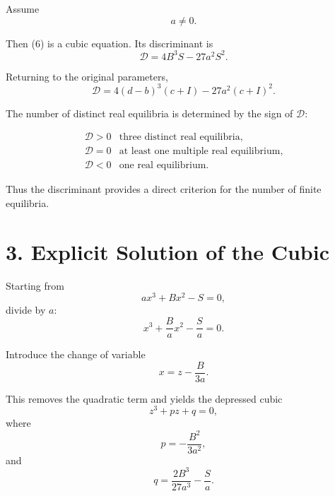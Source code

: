 \documentclass[11pt,a4paper]{article}
\begin{document}
Assume
\begin{equation}
a\neq0.
\end{equation}

Then (6) is a cubic equation. Its discriminant is
\begin{equation}
\boxed{
\mathcal{D}
=
4B^3S-27a^2S^2.
}
\tag{8}
\end{equation}

Returning to the original parameters,
\begin{equation}
\boxed{
\mathcal{D}
=
4(d-b)^3(c+I)
-
27a^2(c+I)^2.
}
\tag{9}
\end{equation}

The number of distinct real equilibria is determined by the sign of
$\mathcal{D}$:

\begin{equation}
\boxed{
\begin{array}{c|c}
\mathcal{D}>0
&
\text{three distinct real equilibria},
\\[2mm]
\mathcal{D}=0
&
\text{at least one multiple real equilibrium},
\\[2mm]
\mathcal{D}<0
&
\text{one real equilibrium}.
\end{array}}
\tag{10}
\end{equation}

Thus the discriminant provides a direct criterion for the number of
finite equilibria.

\section{3. Explicit Solution of the Cubic}

Starting from
\begin{equation}
a x^3+B x^2-S=0,
\end{equation}
divide by $a$:
\begin{equation}
x^3+\frac{B}{a}x^2-\frac{S}{a}=0.
\tag{11}
\end{equation}

Introduce the change of variable
\begin{equation}
\boxed{
x=z-\frac{B}{3a}.
}
\tag{12}
\end{equation}

This removes the quadratic term and yields the depressed cubic
\begin{equation}
z^3+pz+q=0,
\tag{13}
\end{equation}
where
\begin{equation}
\boxed{
p=-\frac{B^2}{3a^2},
}
\tag{14}
\end{equation}
and
\begin{equation}
\boxed{
q=
\frac{2B^3}{27a^3}
-\frac{S}{a}.
}
\tag{15}
\end{equation}
\end{document}
